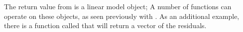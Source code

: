 \begin{knitrout}
\end{knitrout}

The return value from  is a linear model object;
A number of functions can operate on these objects, as
seen previously with .  As an additional example,
there is a function called  that will return a
vector of the residuals.

